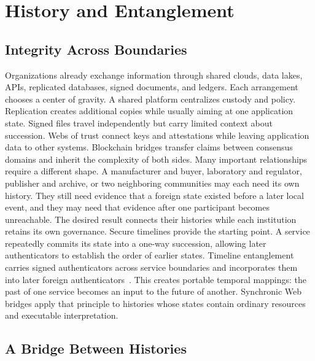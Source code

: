 \section{History and Entanglement}
\label{sec:history-entanglement}
\label{sec:historical-structure}
\label{sec:bridges}

\subsection{Integrity Across Boundaries}

Organizations already exchange information through shared clouds, data lakes, APIs, replicated databases, signed documents, and ledgers. Each arrangement chooses a center of gravity. A shared platform centralizes custody and policy. Replication creates additional copies while usually aiming at one application state. Signed files travel independently but carry limited context about succession. Webs of trust connect keys and attestations while leaving application data to other systems. Blockchain bridges transfer claims between consensus domains and inherit the complexity of both sides. Many important relationships require a different shape. A manufacturer and buyer, laboratory and regulator, publisher and archive, or two neighboring communities may each need its own history. They still need evidence that a foreign state existed before a later local event, and they may need that evidence after one participant becomes unreachable. The desired result connects their histories while each institution retains its own governance. Secure timelines provide the starting point. A service repeatedly commits its state into a one-way succession, allowing later authenticators to establish the order of earlier states. Timeline entanglement carries signed authenticators across service boundaries and incorporates them into later foreign authenticators~\cite{Maniatis2002timeline}. This creates portable temporal mappings: the past of one service becomes an input to the future of another. Synchronic Web bridges apply that principle to histories whose states contain ordinary resources and executable interpretation.

\subsection{A Bridge Between Histories}

